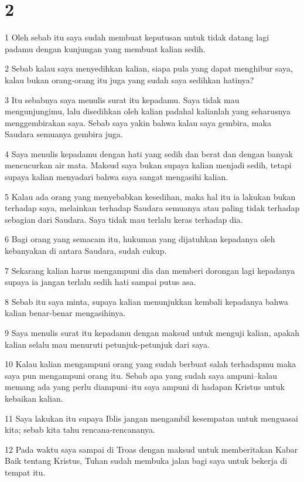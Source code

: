 \chapter{2}

\par 1 Oleh sebab itu saya sudah membuat keputusan untuk tidak datang lagi padamu dengan kunjungan yang membuat kalian sedih.
\par 2 Sebab kalau saya menyedihkan kalian, siapa pula yang dapat menghibur saya, kalau bukan orang-orang itu juga yang sudah saya sedihkan hatinya?
\par 3 Itu sebabnya saya menulis surat itu kepadamu. Saya tidak mau mengunjungimu, lalu disedihkan oleh kalian padahal kalianlah yang seharusnya menggembirakan saya. Sebab saya yakin bahwa kalau saya gembira, maka Saudara semuanya gembira juga.
\par 4 Saya menulis kepadamu dengan hati yang sedih dan berat dan dengan banyak mencucurkan air mata. Maksud saya bukan supaya kalian menjadi sedih, tetapi supaya kalian menyadari bahwa saya sangat mengasihi kalian.
\par 5 Kalau ada orang yang menyebabkan kesedihan, maka hal itu ia lakukan bukan terhadap saya, melainkan terhadap Saudara semuanya atau paling tidak terhadap sebagian dari Saudara. Saya tidak mau terlalu keras terhadap dia.
\par 6 Bagi orang yang semacam itu, hukuman yang dijatuhkan kepadanya oleh kebanyakan di antara Saudara, sudah cukup.
\par 7 Sekarang kalian harus mengampuni dia dan memberi dorongan lagi kepadanya supaya ia jangan terlalu sedih hati sampai putus asa.
\par 8 Sebab itu saya minta, supaya kalian menunjukkan kembali kepadanya bahwa kalian benar-benar mengasihinya.
\par 9 Saya menulis surat itu kepadamu dengan maksud untuk menguji kalian, apakah kalian selalu mau menuruti petunjuk-petunjuk dari saya.
\par 10 Kalau kalian mengampuni orang yang sudah berbuat salah terhadapmu maka saya pun mengampuni orang itu. Sebab apa yang sudah saya ampuni--kalau memang ada yang perlu diampuni--itu saya ampuni di hadapan Kristus untuk kebaikan kalian.
\par 11 Saya lakukan itu supaya Iblis jangan mengambil kesempatan untuk menguasai kita; sebab kita tahu rencana-rencananya.
\par 12 Pada waktu saya sampai di Troas dengan maksud untuk memberitakan Kabar Baik tentang Kristus, Tuhan sudah membuka jalan bagi saya untuk bekerja di tempat itu.
